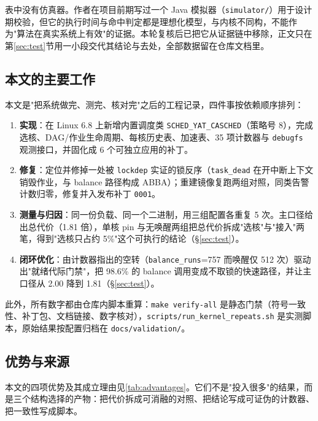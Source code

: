 表中没有仿真器。作者在项目前期写过一个 Java 模拟器（\texttt{simulator/}）用于设计期校验，但它的执行时间与命中判定都是理想化模型，与内核不同构，不能作为"算法在真实系统上有效"的证据。本轮复核后已把它从证据链中移除，正文只在第\ref{sec:test}节用一小段交代其结论与去处，全部数据留在仓库文档里。

\subsection{本文的主要工作}

本文是"把系统做完、测完、核对完"之后的工程记录，四件事按依赖顺序排列：

\begin{enumerate}
    \item \textbf{实现}：在 Linux 6.8 上新增内置调度类 \texttt{SCHED\_YAT\_CASCHED}（策略号 8），完成选核、DAG/作业生命周期、每核历史表、加速表、35 项计数器与 \texttt{debugfs} 观测接口，并固化成 6 个可独立应用的补丁。
    \item \textbf{修复}：定位并修掉一处被 \texttt{lockdep} 实证的锁反序（\texttt{task\_dead} 在开中断上下文销毁作业，与 balance 路径构成 ABBA）；重建镜像复跑两组对照，同类告警计数归零，修复并入发布补丁 \texttt{0001}。
    \item \textbf{测量与归因}：同一份负载、同一个二进制，用三组配置各重复 5 次。主口径给出总代价（1.81 倍），单核 pin 与无唤醒两组把总代价拆成"选核"与"接入"两笔，得到"选核只占约 5\%"这个可执行的结论（\S\ref{sec:test}）。
    \item \textbf{闭环优化}：由计数器指出的空转（\texttt{balance\_runs}=757 而唤醒仅 512 次）驱动出"就绪代际门禁"，把 98.6\% 的 balance 调用变成不取锁的快速路径，并让主口径从 2.00 降到 1.81（\S\ref{sec:test}）。
\end{enumerate}

此外，所有数字都由仓库内脚本重算：\texttt{make verify-all} 是静态门禁（符号一致性、补丁包、文档链接、数字核对），\texttt{scripts/run\_kernel\_repeats.sh} 是实测脚本，原始结果按配置归档在 \texttt{docs/validation/}。

\subsection{优势与来源}

本文的四项优势及其成立理由见\autoref{tab:advantages}。它们不是"投入很多"的结果，而是三个结构选择的产物：把代价拆成可消融的对照、把结论写成可证伪的计数器、把一致性写成脚本。

